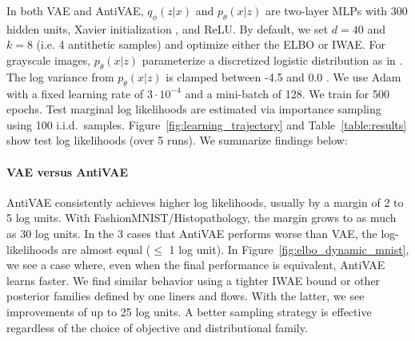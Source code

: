 In both VAE and AntiVAE, $q_\phi(z|x)$ and $p_\theta(x|z)$ are two-layer MLPs with 300 hidden units, Xavier initialization \cite{glorot2010understanding}, and ReLU. By default, we set $d=40$ and $k=8$ (i.e. 4 antithetic samples) and optimize either the ELBO or IWAE. For grayscale images, $p_\theta(x|z)$ parameterize a discretized logistic distribution as in \cite{kingma2016improved, tomczak2017vae}. The log variance from $p_\theta(x|z)$ is clamped between -4.5 and 0.0 \cite{tomczak2017vae}. We use Adam \cite{kingma2014adam} with a fixed learning rate of $3\cdot 10^{-4}$ and a mini-batch of 128. We train for 500 epochs. Test marginal log likelihoods are estimated via importance sampling using 100 i.i.d.~samples. 
Figure~\ref{fig:learning_trajectory} and Table~\ref{table:results} show test log likelihoods (over 5 runs). We summarize findings below:

\paragraph{VAE versus AntiVAE} AntiVAE consistently achieves higher log likelihoods, usually by a margin of 2 to 5 log units. With FashionMNIST/Histopathology, the margin grows to as much as 30 log units. In the 3 cases that AntiVAE performs worse than VAE, the log-likelihoods are almost equal ($\leq$ 1 log unit). In Figure~\ref{fig:elbo_dynamic_mnist}, we see a case where, even when the final performance is equivalent, AntiVAE learns faster. We find similar behavior using a tighter IWAE bound or other posterior families defined by one liners and flows. With the latter, we see improvements of up to 25 log units. A better sampling strategy is effective regardless of the choice of objective and distributional family.



